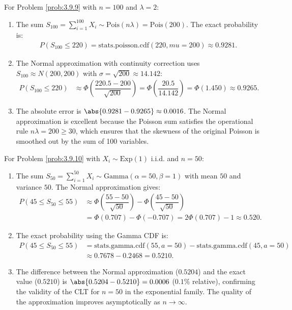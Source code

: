 \begin{solucion}
	\label{sol:3.9.9}
	For Problem \ref{prob:3.9.9} with $n = 100$ and $\lambda = 2$:
	\begin{enumerate}
		\item The sum $S_{100} = \sum_{i=1}^{100} X_{i} \sim \text{Pois}(n\lambda) = \text{Pois}(200)$. The exact probability is:
		\begin{align*}
			P(S_{100} \le 220) = \text{stats.poisson.cdf}(220, mu=200) \approx 0.9281.
		\end{align*}
		\item The Normal approximation with continuity correction uses $S_{100} \approx N(200, 200)$ with $\sigma = \sqrt{200} \approx 14.142$:
		\begin{align*}
			P(S_{100} \le 220) &\approx \Phi\left(\dfrac{220.5 - 200}{\sqrt{200}}\right) = \Phi\left(\dfrac{20.5}{14.142}\right) = \Phi(1.450) \approx 0.9265.
		\end{align*}
		\item The absolute error is $\abs{0.9281 - 0.9265} \approx 0.0016$. The Normal approximation is excellent because the Poisson sum satisfies the operational rule $n\lambda = 200 \ge 30$, which ensures that the skewness of the original Poisson is smoothed out by the sum of 100 variables.
	\end{enumerate}
\end{solucion}

\begin{solucion}
	\label{sol:3.9.10}
	For Problem \ref{prob:3.9.10} with $X_{i} \sim \text{Exp}(1)$ i.i.d. and $n = 50$:
	\begin{enumerate}
		\item The sum $S_{50} = \sum_{i=1}^{50} X_{i} \sim \text{Gamma}(\alpha = 50, \beta = 1)$ with mean $50$ and variance $50$. The Normal approximation gives:
		\begin{align*}
			P(45 \le S_{50} \le 55) &\approx \Phi\left(\dfrac{55 - 50}{\sqrt{50}}\right) - \Phi\left(\dfrac{45 - 50}{\sqrt{50}}\right) \\
			&= \Phi(0.707) - \Phi(-0.707) = 2\Phi(0.707) - 1 \approx 0.520.
		\end{align*}
		\item The exact probability using the Gamma CDF is:
		\begin{align*}
			P(45 \le S_{50} \le 55) &= \text{stats.gamma.cdf}(55, a=50) - \text{stats.gamma.cdf}(45, a=50) \\
			&\approx 0.7678 - 0.2468 = 0.5210.
		\end{align*}
		\item The difference between the Normal approximation ($0.5204$) and the exact value ($0.5210$) is $\abs{0.5204 - 0.5210} = 0.0006$ ($0.1\%$ relative), confirming the validity of the CLT for $n = 50$ in the exponential family. The quality of the approximation improves asymptotically as $n \to \infty$. \qedhere
	\end{enumerate}
\end{solucion}

